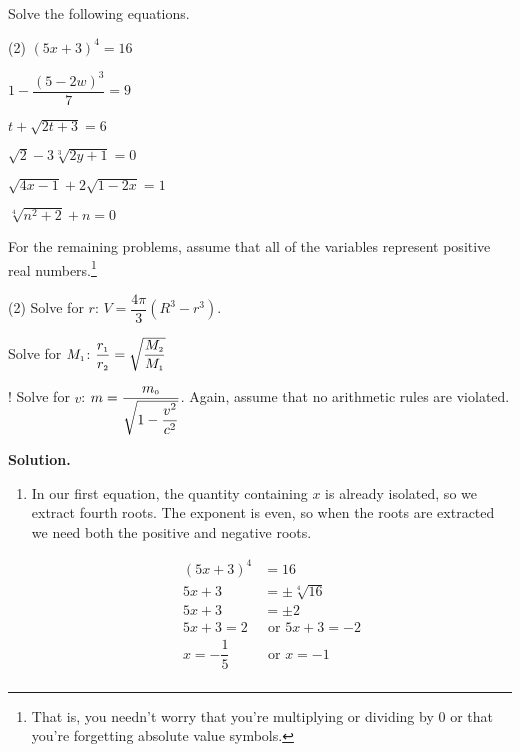 \begin{ex}\label{radicaleqnreview}  Solve the following equations.


\begin{tasks}(2)
\task  $(5x +3)^{4} = 16$

\task  $1 - \dfrac{(5-2w)^3}{7} = 9$

\task  $t + \sqrt{2t+3} = 6$

\task $\sqrt{2} - 3\sqrt[3]{2y+1} = 0$ 

\task  $\sqrt{4x-1}  + 2\sqrt{1 - 2x} = 1$

\task  $\sqrt[4]{n^2 + 2} + n = 0$

\end{tasks}

For the remaining problems, assume that all of the variables represent positive real numbers.\footnote{That is, you needn't worry that you're multiplying or dividing by $0$ or that you're forgetting absolute value symbols.}

\begin{tasks}[resume](2)
\task  Solve for $r$:  $V = \dfrac{4\pi}{3}(R^3 - r^3)$.

\task  Solve for $M_{\text{\tiny$1$}}$:  $\dfrac{r_{\text{\tiny$1$}}}{r_{\text{\tiny$2$}}} = \sqrt{\dfrac{M_{\text{\tiny$2$}}}{M_{\text{\tiny$1$}}}}$

\task!  Solve for $v$:  $m = \dfrac{m_{\text{\tiny$0$}}}{\sqrt{1 - \dfrac{v^2}{c^2}}}$.  Again, assume that no arithmetic rules are violated.

\end{tasks}


{\bf Solution.}

\begin{enumerate}

\item  In our first equation, the quantity containing $x$ is already isolated, so we extract fourth roots. The exponent is even, so when the roots are extracted we need both the positive and negative roots. 

\begin{align*}
(5x +3)^{4} & = 16 \\ 
5x+3 & = \pm \sqrt[4]{16} \tag{Extract fourth roots} \\ 
5x + 3 & = \pm 2 \\ 
5x+3 = 2 & \text{ or } 5x+3 = -2 \\
x = -\dfrac{1}{5} & \text{ or } x = -1 \\
\end{align*}


\end{enumerate}
\end{ex}
